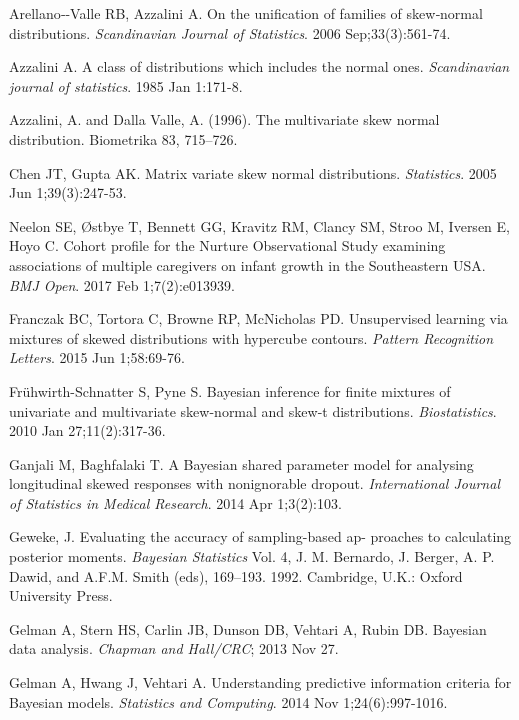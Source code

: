 \documentclass[useAMS,referee]{biom}
\begin{document}
\begin{thebibliography}{}

\bibitem{ } Arellano‐-Valle RB, Azzalini A. On the unification of families of skew‐normal distributions. \textit{Scandinavian Journal of Statistics}. 2006 Sep;33(3):561-74.

\bibitem{ } Azzalini A. A class of distributions which includes the normal ones. \textit{Scandinavian journal of statistics}. 1985 Jan 1:171-8.

\bibitem{ } Azzalini, A. and Dalla Valle, A. (1996). The multivariate skew normal distribution. Biometrika 83, 715–726.

\bibitem{ } Chen JT, Gupta AK. Matrix variate skew normal distributions. \textit{Statistics}. 2005 Jun 1;39(3):247-53.

\bibitem{ } Neelon SE, \O stbye T, Bennett GG, Kravitz RM, Clancy SM, Stroo M, Iversen E, Hoyo C. Cohort profile for the Nurture Observational Study examining associations of multiple caregivers on infant growth in the Southeastern USA. \textit{BMJ Open}. 2017 Feb 1;7(2):e013939.

\bibitem{ } Franczak BC, Tortora C, Browne RP, McNicholas PD. Unsupervised learning via mixtures of skewed distributions with hypercube contours. \textit{Pattern Recognition Letters}. 2015 Jun 1;58:69-76.

\bibitem{ } Fr\"{u}hwirth-Schnatter S, Pyne S. Bayesian inference for finite mixtures of univariate and multivariate skew-normal and skew-t distributions. \textit{Biostatistics}. 2010 Jan 27;11(2):317-36.

\bibitem{ } Ganjali M, Baghfalaki T. A Bayesian shared parameter model for analysing longitudinal skewed responses with nonignorable dropout. \textit{International Journal of Statistics in Medical Research}. 2014 Apr 1;3(2):103.

\bibitem{ } Geweke, J. Evaluating the accuracy of sampling-based ap- proaches to calculating posterior moments. \textit{Bayesian Statistics} Vol. 4, J. M. Bernardo, J. Berger, A. P. Dawid, and A.F.M. Smith (eds), 169–193. 1992. Cambridge, U.K.: Oxford University Press.

\bibitem{ } Gelman A, Stern HS, Carlin JB, Dunson DB, Vehtari A, Rubin DB. Bayesian data analysis. \textit{Chapman and Hall/CRC}; 2013 Nov 27.

\bibitem{ } Gelman A, Hwang J, Vehtari A. Understanding predictive information criteria for Bayesian models. \textit{Statistics and Computing}. 2014 Nov 1;24(6):997-1016.


\end{thebibliography}
\end{document}
